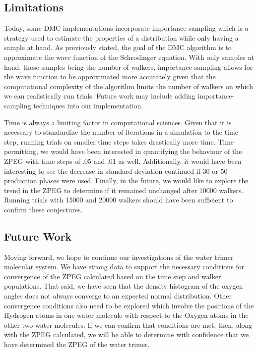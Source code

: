 \documentclass[journal=jacsat,manuscript=article]{achemso}
\begin{document}
\subsection{Limitations}
Today, some DMC implementations incorporate importance sampling which is a strategy used to estimate the properties of a distribution while only having a sample at hand. As previously stated, the goal of the DMC algorithm is to approximate the wave function of the Schrodinger equation. With only samples at hand, those samples being the number of walkers, importance sampling allows for the wave function to be approximated more accurately given that the computational complexity of the algorithm limits the number of walkers on which we can realistically run trials. Future work may include adding importance-sampling techniques into our implementation. 

Time is always a limiting factor in computational sciences. Given that it is necessary to standardize the number of iterations in a simulation to the time step, running trials on smaller time steps takes drastically more time. Time permitting, we would have been interested in quantifying the behaviour of the ZPEG with time steps of .05 and .01 as well. Additionally, it would have been interesting to see the decrease in standard deviation continued if 30 or 50 production phases were used. Finally, in the future, we would like to explore the trend in the ZPEG to determine if it remained unchanged after 10000 walkers. Running trials with 15000 and 20000 walkers should have been sufficient to confirm these conjectures.

\subsection{Future Work}
Moving forward, we hope to continue our investigations of the water trimer molecular system. We have strong data to support the necessary conditions for convergence of the ZPEG calculated based on the time step and walker populations. That said, we have seen that the density histogram of the oxygen angles does not always converge to an expected normal distribution. Other convergence conditions also need to be explored which involve the positions of the Hydrogen atoms in one water molecule with respect to the Oxygen atoms in the other two water molecules. If we can confirm that conditions are met, then, along with the ZPEG calculated, we will be able to determine with confidence that we have determined the ZPEG of the water trimer. 
\end{document}
